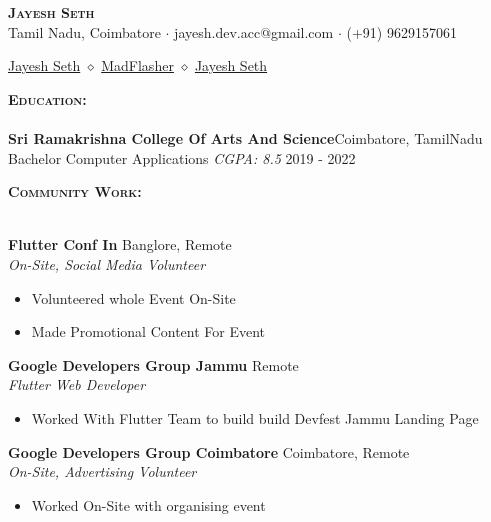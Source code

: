 \documentclass[a4paper]{article}
\newcommand{\lineunder} {
    \vspace*{-8pt} \\
    \hspace*{-18pt} \hrulefill \\
}
\newcommand{\header} [1] {
    {\hspace*{-18pt}\vspace*{6pt} \textsc{#1} }
    \vspace*{-6pt} \lineunder
}
\begin{document}
\vspace*{-40pt}

    

\vspace*{-10pt}
\begin{center}
	{\Huge \bfseries \scshape {Jayesh Seth}}\\
	 Tamil Nadu, Coimbatore $\cdot$ 
         jayesh.dev.acc@gmail.com $\cdot$ 
         (+91) 9629157061\\
\end{center}

\begin{center}
    \href{https://www.linkedin.com/in/jayesh-seth-0b80a8217/}{Jayesh Seth} $\diamond$ 
     \href{https://github.com/MadFlasheroo7}{MadFlasher} $\diamond$
     \href{https://twitter.com/Madflasheroo7}{Jayesh Seth}\\
\end{center}

\header{ \textbf{Education:}}
\textbf{Sri Ramakrishna College Of Arts And Science}\hfill Coimbatore, TamilNadu\\
Bachelor Computer Applications \textit{CGPA: 8.5} \hfill 2019 - 2022\\
\vspace*{4pt}

\header{ \textbf{Community Work:}}
\vspace{1mm}

\textbf{Flutter Conf In} \hfill Banglore, Remote\\
\textit{On-Site, Social Media Volunteer}\\
\vspace{-1mm}
\begin{itemize} \itemsep 1pt
	\item Volunteered whole Event On-Site
	\item Made Promotional Content For Event
\end{itemize}
\textbf{Google Developers Group Jammu} \hfill Remote\\
\textit{Flutter Web Developer}\\
\vspace{-1mm}
\begin{itemize} \itemsep 1pt
	\item Worked With Flutter Team to build build Devfest Jammu Landing Page
\end{itemize}
\textbf{Google Developers Group Coimbatore} \hfill Coimbatore, Remote\\
\textit{On-Site, Advertising Volunteer}\\
\vspace{-1mm}
\begin{itemize} \itemsep 1pt
	\item Worked On-Site with organising event
\end{itemize}
\end{document}
